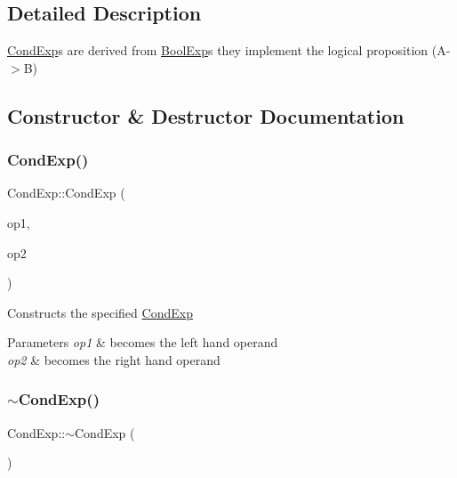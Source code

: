 \subsection{Detailed Description}
\mbox{\hyperlink{classCondExp}{Cond\+Exp}}\textquotesingle{}s are derived from \mbox{\hyperlink{classBoolExp}{Bool\+Exp}}\textquotesingle{}s they implement the logical proposition (A-\/$>$B) 

\subsection{Constructor \& Destructor Documentation}
\mbox{\label{classCondExp_a7c531f5e34f68fc5d5436a0a521de0b5}} 
\subsubsection{\texorpdfstring{Cond\+Exp()}{CondExp()}}
{\footnotesize\ttfamily Cond\+Exp\+::\+Cond\+Exp (\begin{DoxyParamCaption}\item[{shared\+\_\+ptr$<$ \mbox{\hyperlink{classBoolExp}{Bool\+Exp}} $>$}]{op1,  }\item[{shared\+\_\+ptr$<$ \mbox{\hyperlink{classBoolExp}{Bool\+Exp}} $>$}]{op2 }\end{DoxyParamCaption})}

Constructs the specified \mbox{\hyperlink{classCondExp}{Cond\+Exp}} 
\begin{DoxyParams}{Parameters}
{\em op1} & becomes the left hand operand \\
\hline
{\em op2} & becomes the right hand operand \\
\hline
\end{DoxyParams}
\mbox{\label{classCondExp_aad96be2ad7ce013bc05dfc77f541bf24}} 
\subsubsection{\texorpdfstring{$\sim$\+Cond\+Exp()}{~CondExp()}}
{\footnotesize\ttfamily Cond\+Exp\+::$\sim$\+Cond\+Exp (\begin{DoxyParamCaption}{ }\end{DoxyParamCaption})\hspace{0.3cm}{\ttfamily [virtual]}}

